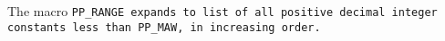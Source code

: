 The macro \tt{PP_RANGE} expands to list of all positive decimal
integer constants less than \tt{PP_MAW}, in increasing order.
